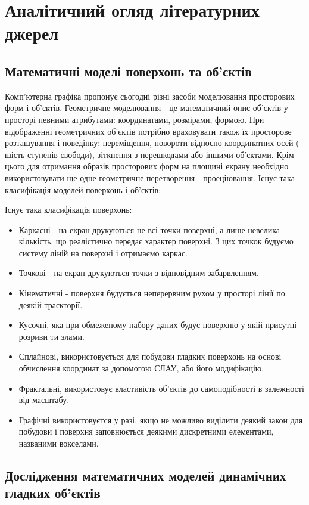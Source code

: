 \documentclass[14pt,a4paper]{extarticle}
\theoremstyle{definition}
\renewcommand{\[}{\begin{singlespace}\begin{equation*}}
\renewcommand{\]}{\end{equation*}\end{singlespace}}
\begin{document}
\section{Аналітичний огляд літературних джерел}

\subsection{Математичні моделі поверхонь та об'єктів}

Комп'ютерна графіка пропонує сьогодні різні засоби моделювання просторових форм і об'єктів. Геометричне моделювання - це математичний опис об'єктів у просторі певними атрибутами: координатами, розмірами, формою. При відображенні геометричних об'єктів потрібно враховувати також їх просторове розташування і поведінку: переміщення, повороти відносно координатних осей ( шість ступенів свободи), зіткнення з перешкодами або іншими об'єктами. Крім цього для отримання образів просторових форм на площині екрану необхідно використовувати ще одне геометричне перетворення - проеціювання.
Існує така класифікація моделей поверхонь і об'єктів:

Існує така класифікація поверхонь:
\begin{itemize}
\item Каркасні - на екран друкуються не всі точки поверхні, а лише невелика кількість, що реалістично передає характер поверхні. З цих точкок будуємо систему ліній на поверхні і отримаємо каркас.
\item Точкові - на екран друкуються точки з відповідним забарвленням.
\item Кінематичні - поверхня будується неперервним рухом у просторі лінії по деякій траєкторії.
\item Кусочні, яка при обмеженому набору даних будує поверхню у якій присутні розриви ти злами.
\item Сплайнові, використовується для побудови гладких поверхонь на основі обчислення координат за допомогою СЛАУ, або його модифікацію.
\item Фрактальні, використовує властивість об'єктів до самоподібності в залежності від масштабу.
\item Графічні використовуєтся у разі, якщо не можливо виділити деякий закон для побудови і поверхня заповнюється деякими дискретними елементами, названими вокселами.
\end{itemize}

\subsection{Дослідження математичних моделей динамічних гладких об'єктів}
\end{document}
